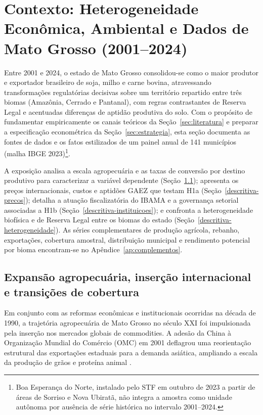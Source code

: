 \section{Contexto: Heterogeneidade Econômica, Ambiental e Dados de Mato Grosso (2001--2024)}
\label{sec:contexto-dados}



Entre 2001 e 2024, o estado de Mato Grosso consolidou-se como o maior produtor e exportador brasileiro de soja, milho e carne bovina, atravessando transformações regulatórias decisivas sobre um território repartido entre três biomas (Amazônia, Cerrado e Pantanal), com regras contrastantes de Reserva Legal e acentuadas diferenças de aptidão produtiva do solo. Com o propósito de fundamentar empiricamente os canais teóricos da Seção~\ref{sec:literatura} e preparar a especificação econométrica da Seção~\ref{sec:estrategia}, esta seção documenta as fontes de dados e os fatos estilizados de um painel anual de 141 municípios (malha IBGE 2023)\footnote{Boa Esperança do Norte, instalado pelo STF em outubro de 2023 a partir de áreas de Sorriso e Nova Ubiratã, não integra a amostra como unidade autônoma por ausência de série histórica no intervalo 2001--2024.}. 

A exposição analisa a escala agropecuária e as taxas de conversão por destino produtivo para caracterizar a variável dependente (Seção~\ref{descritiva-retornos}); apresenta os preços internacionais, custos e aptidões GAEZ que testam H1a (Seção~\ref{descritiva-precos}); detalha a atuação fiscalizatória do IBAMA e a governança setorial associadas a H1b (Seção~\ref{descritiva-instituicoes}); e confronta a heterogeneidade biofísica e de Reserva Legal entre os biomas do estado (Seção~\ref{descritiva-heterogeneidade}). As séries complementares de produção agrícola, rebanho, exportações, cobertura amostral, distribuição municipal e rendimento potencial por bioma encontram-se no Apêndice~\ref{ap:complementos}.

\subsection{Expansão agropecuária, inserção internacional e transições de cobertura}
\label{descritiva-retornos}

Em conjunto com as reformas econômicas e institucionais ocorridas na década de 1990, a trajetória agropecuária de Mato Grosso no século XXI foi impulsionada pela inserção nos mercados globais de commodities. A adesão da China à Organização Mundial do Comércio (OMC) em 2001 deflagrou uma reorientação estrutural das exportações estaduais para a demanda asiática, ampliando a escala da produção de grãos e proteína animal \cite{fearnside2016china, LathuilliereEtAl2014}.

